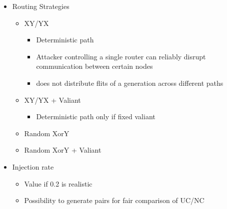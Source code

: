 \documentclass[
	paper=a4,
	fontsize=11pt,
	parskip=full %
]{scrreprt}
\begin{document}
\begin{itemize}
        \item Routing Strategies
            \begin{itemize}
                \item XY/YX
                    \begin{itemize}
                        \item Deterministic path
                        \item Attacker controlling a single router can reliably disrupt communication between certain nodes
                        \item does not distribute flits of a generation across different paths
                    \end{itemize}
                \item XY/YX + Valiant
                    \begin{itemize}
                        \item Deterministic path only if fixed valiant
                    \end{itemize}
                \item Random XorY
                \item Random XorY + Valiant
            \end{itemize}
        \item Injection rate
            \begin{itemize}
                \item Value if 0.2 is realistic
                \item Possibility to generate pairs for fair comparison of UC/NC
            \end{itemize}
    \end{itemize}
\end{document}

